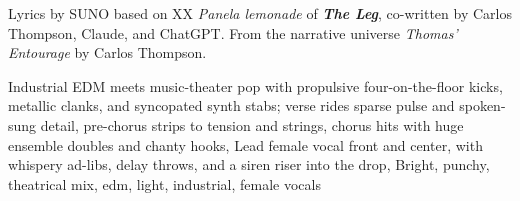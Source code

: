 
\begin{notes}
Lyrics by SUNO based on XX \emph{Panela lemonade} of \emph{\bfseries The Leg}, %
co-written by Carlos Thompson, Claude, and ChatGPT. %
From the narrative universe \emph{Thomas’ Entourage} by Carlos Thompson.
\end{notes}
\begin{style}
Industrial EDM meets music-theater pop with propulsive four-on-the-floor kicks, metallic clanks, and syncopated synth stabs; verse rides sparse pulse and spoken-sung detail, pre-chorus strips to tension and strings, chorus hits with huge ensemble doubles and chanty hooks, Lead female vocal front and center, with whispery ad-libs, delay throws, and a siren riser into the drop, Bright, punchy, theatrical mix, edm, light, industrial, female vocals
\end{style}

